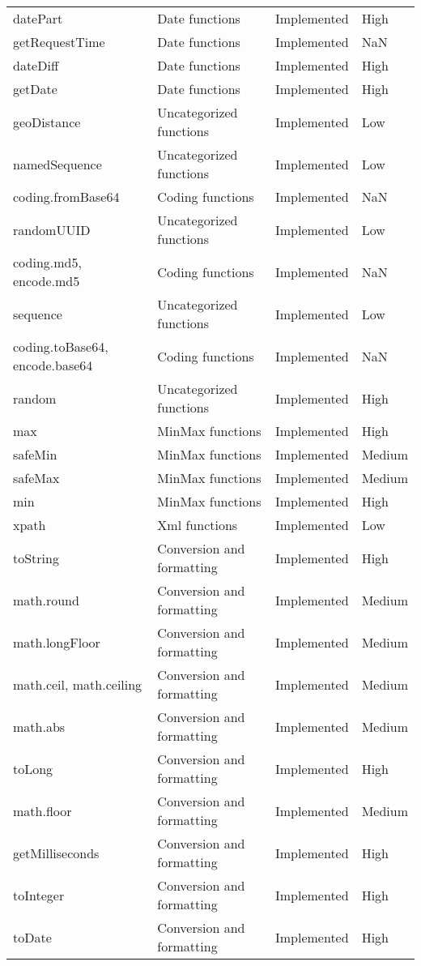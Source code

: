 \begin{longtable}{llll}
datePart & Date functions & Implemented & High \\
getRequestTime & Date functions & Implemented & NaN \\
dateDiff & Date functions & Implemented & High \\
getDate & Date functions & Implemented & High \\
geoDistance & Uncategorized functions & Implemented & Low \\
namedSequence & Uncategorized functions & Implemented & Low \\
coding.fromBase64 & Coding functions & Implemented & NaN \\
randomUUID & Uncategorized functions & Implemented & Low \\
coding.md5, encode.md5 & Coding functions & Implemented & NaN \\
sequence & Uncategorized functions & Implemented & Low \\
coding.toBase64, encode.base64 & Coding functions & Implemented & NaN \\
random & Uncategorized functions & Implemented & High \\
max & MinMax functions & Implemented & High \\
safeMin & MinMax functions & Implemented & Medium \\
safeMax & MinMax functions & Implemented & Medium \\
min & MinMax functions & Implemented & High \\
xpath & Xml functions & Implemented & Low \\
toString & Conversion and formatting & Implemented & High \\
math.round & Conversion and formatting & Implemented & Medium \\
math.longFloor & Conversion and formatting & Implemented & Medium \\
math.ceil, math.ceiling & Conversion and formatting & Implemented & Medium \\
math.abs & Conversion and formatting & Implemented & Medium \\
toLong & Conversion and formatting & Implemented & High \\
math.floor & Conversion and formatting & Implemented & Medium \\
getMilliseconds & Conversion and formatting & Implemented & High \\
toInteger & Conversion and formatting & Implemented & High \\
toDate & Conversion and formatting & Implemented & High \\

\end{longtable}
